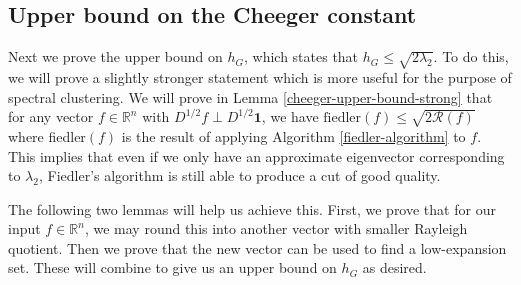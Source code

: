 \documentclass[a4paper,11pt]{article}
\theoremstyle{definition}
\newcommand{\R}{\mathbb{R}}
\newcommand{\rayleigh}[1]{\mathcal{R}\left(#1\right)}
\begin{document}
\subsection{Upper bound on the Cheeger constant}

Next we prove the upper bound on $h_G$, which states that $h_G \le \sqrt{2\lambda_2}$. To do this, we will prove a slightly stronger statement which is more useful for the purpose of spectral clustering. We will prove in Lemma \ref{cheeger-upper-bound-strong} that for any vector $f \in \R^n$ with $D^{1/2}f \perp D^{1/2}\bm{1}$, we have $\text{fiedler}(f) \le \sqrt{2\rayleigh{f}}$ where fiedler$(f)$ is the result of applying Algorithm \ref{fiedler-algorithm} to $f$. This implies that even if we only have an approximate eigenvector corresponding to $\lambda_2$, Fiedler's algorithm is still able to produce a cut of good quality.

The following two lemmas will help us achieve this. First, we prove that for our input $f \in \R^n$, we may round this into another vector with smaller Rayleigh quotient. Then we prove that the new vector can be used to find a low-expansion set. These will combine to give us an upper bound on $h_G$ as desired.
\end{document}
